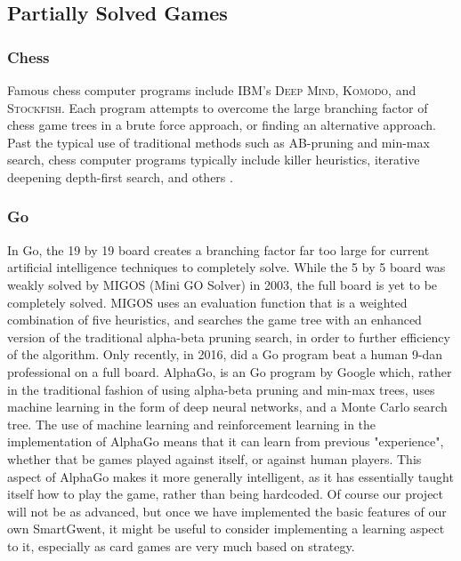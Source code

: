 \documentclass[numbers]{sigplanconf}
\begin{document}
\subsection{Partially Solved Games}
\subsubsection{Chess}
Famous chess computer programs include IBM's \textsc{Deep Mind}, \textsc{Komodo}, and \textsc{Stockfish}. Each program attempts to overcome the large branching factor of chess game trees in a brute force approach, or finding an alternative approach. Past the typical use of traditional methods such as AB-pruning and min-max search, chess computer programs typically include killer heuristics, iterative deepening depth-first search, and others \cite{laramee2000chess}\cite{laramee2000chess2}. 

\subsubsection{Go}
In Go, the 19 by 19 board creates a branching factor far too large for current artificial intelligence techniques to completely solve. While the 5 by 5 board was weakly solved by \textsc{MIGOS} (Mini GO Solver) in 2003\cite{van2003solving}, the full board is yet to be completely solved. \textsc{MIGOS} uses an evaluation function that is a weighted combination of five heuristics, and searches the game tree with an enhanced version of the traditional alpha-beta pruning search, in order to further efficiency of the algorithm. Only recently, in 2016, did a Go program beat a human 9-dan professional on a full board. AlphaGo\cite{silver2016mastering}, is an Go program by Google which, rather in the traditional fashion of using alpha-beta pruning and min-max trees, uses machine learning in the form of deep neural networks, and a Monte Carlo search tree. The use of machine learning and reinforcement learning in the implementation of AlphaGo means that it can learn from previous "experience", whether that be games played against itself, or against human players. This aspect of AlphaGo makes it more generally intelligent, as it has essentially taught itself how to play the game, rather than being hardcoded. Of course our project will not be as advanced, but once we have implemented the basic features of our own SmartGwent, it might be useful to consider implementing a learning aspect to it, especially as card games are very much based on strategy.
\end{document}
